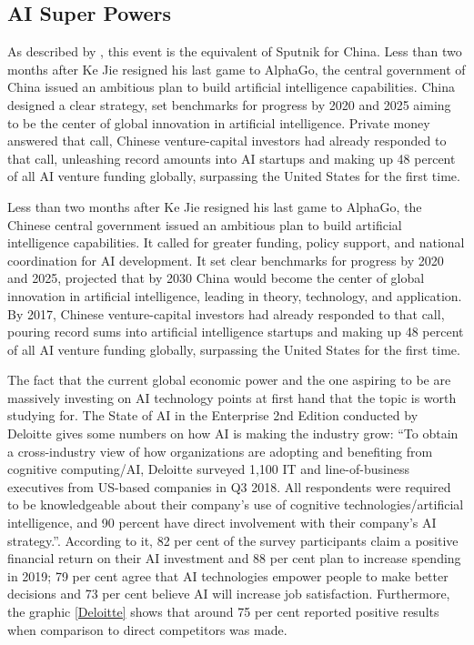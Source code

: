 \subsection{AI Super Powers}

As described by \cite{AISuperPowers2018}, this event is the equivalent of Sputnik for China. Less than two months after Ke Jie resigned his last game to AlphaGo, the central government of China issued an ambitious plan to build artificial intelligence capabilities. China designed a clear strategy, set benchmarks for progress by 2020 and 2025 aiming to be the center of global innovation in artificial intelligence. Private money answered that call, Chinese venture-capital investors had already responded to that call, unleashing record amounts into AI startups and making up 48 percent of all AI venture funding globally, surpassing the United States for the first time.

Less than two months after Ke Jie resigned his last game to AlphaGo, the Chinese central government issued an ambitious plan to build artificial intelligence capabilities. It called for greater funding, policy support, and national coordination for AI development. It set clear benchmarks for progress by 2020 and 2025, projected that by 2030 China would become the center of global innovation in artificial intelligence, leading in theory, technology, and application. By 2017, Chinese venture-capital investors had already responded to that call, pouring record sums into artificial intelligence startups and making up 48 percent of all AI venture funding globally, surpassing the United States for the first time.

The fact that the current global economic power and the one aspiring to be  are massively investing on AI technology points at first hand that the topic is worth studying for. The State of AI in the Enterprise 2nd Edition conducted by Deloitte \cite{AiSurvey} gives some numbers on how AI is making the industry grow: ``To obtain a cross-industry view of how organizations are adopting and benefiting from cognitive computing/AI, Deloitte surveyed 1,100 IT and line-of-business executives from US-based companies in Q3 2018. All respondents were required to be knowledgeable about their company's use of cognitive technologies/artificial intelligence, and 90 percent have direct involvement with their company's AI strategy.''. According to it, 82 per cent of the survey participants claim a positive financial return on their AI investment and 88 per cent plan to increase spending in 2019; 79 per cent agree that AI technologies empower people to make better decisions and 73 per cent believe AI will increase job satisfaction. Furthermore, the graphic \ref{Deloitte} shows that around 75 per cent reported positive results when comparison to direct competitors was made.

